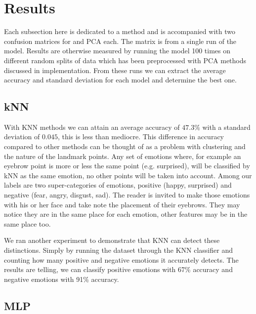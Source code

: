 \section{Results}

Each subsection here is dedicated to a method and is accompanied with two confusion matrices for \tsne and PCA each. The matrix is from a single run of the model. Results are otherwise measured by running the model 100 times on different random splits of data which has been preprocessed with PCA methods discussed in implementation. From these runs we can extract the average accuracy and standard deviation for each model and determine the best one.

\subsection{kNN}


With KNN methods we can attain an average accuracy of $47.3\%$ with a standard deviation of $0.045$, this is less than mediocre. This difference in accuracy compared to other methods can be thought of as a problem with clustering and the nature of the landmark points. Any set of emotions where, for example an eyebrow point is more or less the same point (e.g. surprised), will be classified by kNN as the same emotion, no other points will be taken into account. Among our labels are two super-categories of emotions, positive (happy, surprised) and negative (fear, angry, disgust, sad). The reader is invited to make those emotions with his or her face and take note the placement of their eyebrows. They may notice they are in the same place for each emotion, other features may be in the same place too.

We ran another experiment to demonstrate that KNN can detect these distinctions. Simply by running the dataset through the KNN classifier and counting how many positive and negative emotions it accurately detects. The results are telling, we can classify positive emotions with 67\% accuracy and negative emotions with 91\% accuracy.

\subsection{MLP}


